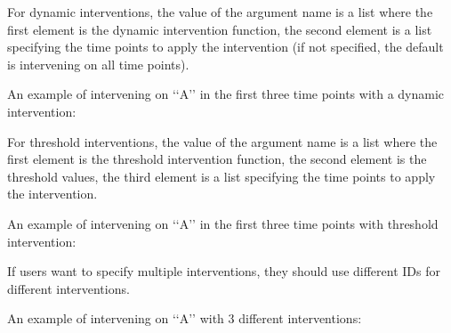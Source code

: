 \documentclass[letterpaper,10pt,english]{sphinxmanual}
\begin{document}
\sphinxAtStartPar
For dynamic interventions, the value of the argument name is a list where the first element is the dynamic intervention function,
the second element is a list specifying the time points to apply the intervention (if not specified, the default is intervening on all time points).

\sphinxAtStartPar
An example of intervening on ‘‘A’’ in the first three time points with a dynamic intervention:

\begin{sphinxVerbatim}[commandchars=\\\{\}]
  \PYG{p}{[} \PYG{p}{[}  \PYG{p}{]}\PYG{p}{]}
\end{sphinxVerbatim}

\sphinxAtStartPar
For threshold interventions, the value of the argument name is a list where the first element is the threshold intervention function, the second element
is the threshold values, the third element is a list specifying the time points to apply the intervention.

\sphinxAtStartPar
An example of intervening on ‘‘A’’ in the first three time points with threshold intervention:

\begin{sphinxVerbatim}[commandchars=\\\{\}]
  \PYG{p}{[} \PYG{p}{[} \PYG{p}{]} \PYG{p}{[}  \PYG{p}{]}\PYG{p}{]}
\end{sphinxVerbatim}

\sphinxAtStartPar
If users want to specify multiple interventions, they should use different IDs for different interventions.

\sphinxAtStartPar
An example of intervening on ‘‘A’’ with 3 different interventions:

\begin{sphinxVerbatim}[commandchars=\\\{\}]
  \PYG{p}{[} \PYG{p}{]}
  \PYG{p}{[}\PYG{p}{]}
  \PYG{p}{[} \PYG{p}{[} \PYG{p}{]}\PYG{p}{]}
\end{sphinxVerbatim}
\end{document}
